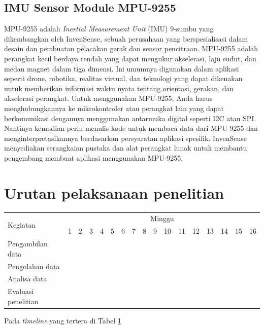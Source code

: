 \subsection{IMU Sensor Module MPU-9255}
MPU-9255 adalah \emph{Inertial Measurement Unit} (IMU) 9-sumbu yang dikembangkan oleh InvenSense, sebuah perusahaan yang berspesialisasi dalam desain dan pembuatan pelacakan gerak dan sensor 
pencitraan. MPU-9255 adalah perangkat kecil berdaya rendah yang dapat mengukur akselerasi, laju sudut, dan medan magnet dalam tiga dimensi. Ini umumnya digunakan dalam aplikasi seperti 
drone, robotika, realitas virtual, dan teknologi yang dapat dikenakan untuk memberikan informasi waktu nyata tentang orientasi, gerakan, dan akselerasi perangkat. 
Untuk menggunakan MPU-9255, Anda harus menghubungkannya ke mikrokontroler atau perangkat lain yang dapat berkomunikasi dengannya menggunakan antarmuka digital seperti I2C atau SPI. 
Nantinya kemudian perlu menulis kode untuk membaca data dari MPU-9255 dan menginterpretasikannya berdasarkan persyaratan aplikasi spesifik. InvenSense menyediakan serangkaian 
pustaka dan alat perangkat lunak untuk membantu pengembang membuat aplikasi menggunakan MPU-9255.

\section{Urutan pelaksanaan penelitian}

\newcommand{\w}{}
\newcommand{\G}{\cellcolor{gray}}
\begin{table}[h!]
  \begin{tabular}{|p{3.5cm}|c|c|c|c|c|c|c|c|c|c|c|c|c|c|c|c|}

    \hline
    \multirow{2}{*}{Kegiatan} & \multicolumn{16}{|c|}{Minggu} \\
    \cline{2-17} &
    1 & 2 & 3 & 4 & 5 & 6 & 7 & 8 & 9 & 10 & 11 & 12 & 13 & 14 & 15 & 16 \\
    \hline

    Pengambilan data &
    \G & \G & \G & \G & \w & \w & \w & \w & \w & \w & \w & \w & \w & \w & \w & \w \\
    \hline

    Pengolahan data &
    \w & \w & \w & \w & \G & \G & \G & \G & \w & \w & \w & \w & \w & \w & \w & \w \\
    \hline

    Analisa data &
    \w & \w & \w & \w & \w & \w & \w & \w & \G & \G & \G & \G & \w & \w & \w & \w \\
    \hline

    Evaluasi penelitian &
    \w & \w & \w & \w & \w & \w & \w & \w & \w & \w & \w & \w & \G & \G & \G & \G \\
    \hline

  \end{tabular}
  \label{tbl:timeline}
\end{table}

Pada \emph{timeline} yang tertera di Tabel \ref{tbl:timeline} \lipsum[10]
